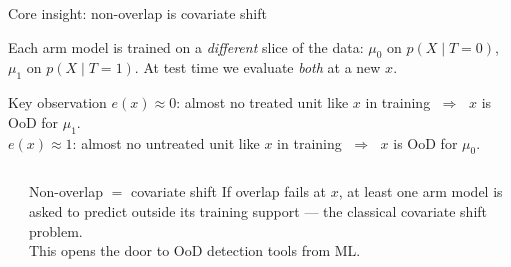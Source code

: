 \documentclass[aspectratio=169]{beamer}
\begin{document}
\begin{frame}{Core insight: non-overlap is covariate shift}

Each arm model is trained on a \emph{different} slice of the data:
$\mu_0$ on $p(X\mid T=0)$, \; $\mu_1$ on $p(X\mid T=1)$.
At test time we evaluate \emph{both} at a new $x$.

\medskip
\begin{block}{Key observation}
$e(x)\approx 0$: almost no treated unit like $x$ in training
$\;\Rightarrow\;$ $x$ is OoD for $\mu_1$.\\[3pt]
$e(x)\approx 1$: almost no untreated unit like $x$ in training
$\;\Rightarrow\;$ $x$ is OoD for $\mu_0$.
\end{block}

\medskip
\begin{columns}
\begin{center}
\end{center}
\small
\begin{block}{Non-overlap $=$ covariate shift}
If overlap fails at $x$, at least one arm model is asked to predict outside its training support --- the classical covariate shift problem.\\[3pt]
This opens the door to OoD detection tools from ML.
\end{block}
\end{columns}
\end{frame}
\end{document}
